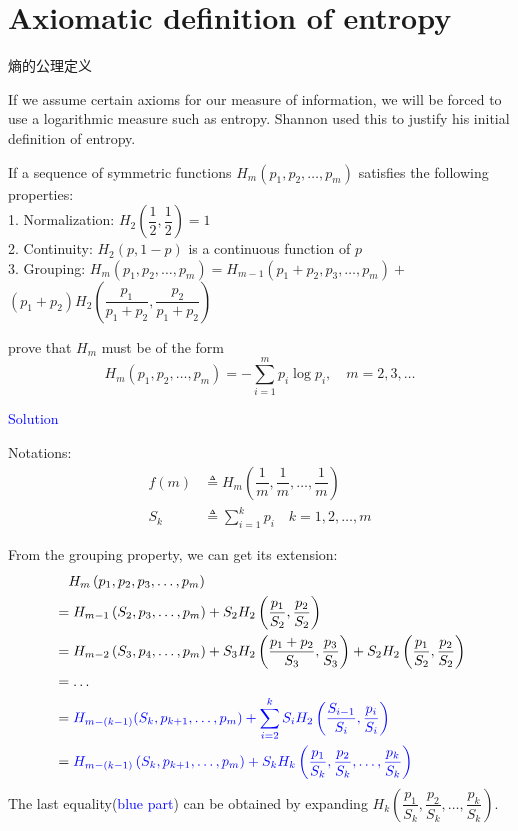 \section{Axiomatic definition of entropy}
\label{sec:Axiomatic_definition_of_entropy}
熵的公理定义

If we assume certain axioms for our measure of information, we will be forced to use a logarithmic measure such as entropy. Shannon used this to justify his initial definition of entropy.

If a sequence of symmetric functions $H_m\left(p_1, p_2, \ldots, p_m\right)$ satisfies the following properties: \\
1. Normalization: $H_2\left(\dfrac{1}{2}, \dfrac{1}{2}\right)=1$ \\
2. Continuity: $H_2(p, 1-p)$ is a continuous function of $p$ \\
3. Grouping: $H_m\left(p_1, p_2, \ldots, p_m\right)=H_{m-1}\left(p_1+p_2, p_3, \ldots, p_m\right)+$ $\left(p_1+p_2\right) H_2\left(\dfrac{p_1}{p_1+p_2}, \dfrac{p_2}{p_1+p_2}\right)$

prove that $H_m$ must be of the form
$$H_m\left(p_1, p_2, \ldots, p_m\right)=-\sum_{i=1}^m p_i \log p_i, \quad m=2,3, \ldots$$

\textcolor{blue}{Solution}

Notations:
\begin{align*}
f(m) &\triangleq H_m\left(\dfrac{1}{m}, \dfrac{1}{m}, \ldots, \dfrac{1}{m}\right) \\
S_k &\triangleq \sum_{i=1}^k p_i \quad k=1,2,\ldots,m
\end{align*}

From the grouping property, we can get its extension:
\begin{align*}
&\quad H_m\left(p_1,p_2, p_3, \ldots, p_m\right) \\
&= H_{m-1}\left(S_2, p_3, \ldots, p_m\right)+S_2 H_2\left(\dfrac{p_1}{S_2}, \dfrac{p_2}{S_2}\right) \\
&= H_{m-2}\left(S_3, p_4, \ldots, p_m\right)+S_3 H_2\left(\dfrac{p_1+p_2}{S_3}, \dfrac{p_3}{S_3}\right)+S_2 H_2\left(\dfrac{p_1}{S_2}, \dfrac{p_2}{S_2}\right) \\
&= \ldots \\
&= \textcolor{blue}{H_{m-(k-1)}(S_k, p_{k+1}, \ldots, p_m)+\sum_{i=2}^k S_iH_2\left(\dfrac{S_{i-1}}{S_i}, \dfrac{p_i}{S_i}\right)} \\
&= \textcolor{blue}{H_{m-(k-1)}\left(S_{k}, p_{k+1}, \ldots, p_m\right) + S_kH_k\left(\dfrac{p_1}{S_k}, \dfrac{p_2}{S_k}, \ldots, \dfrac{p_{k}}{S_k}\right)}
\end{align*}
The last equality(\textcolor{blue}{blue part}) can be obtained by expanding $H_k\left(\dfrac{p_1}{S_k}, \dfrac{p_2}{S_k}, \ldots, \dfrac{p_{k}}{S_k}\right)$.

